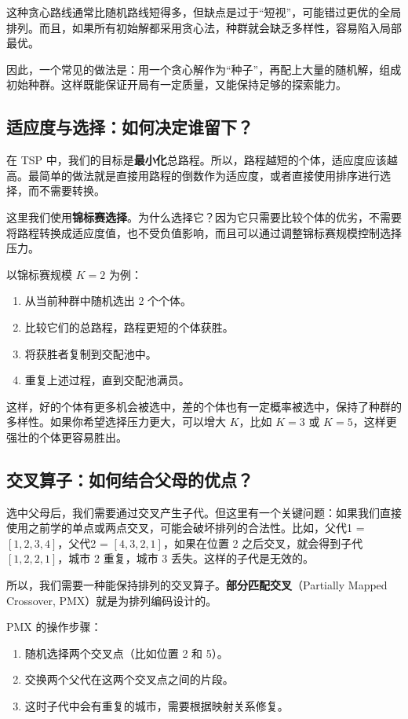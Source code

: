 \documentclass[lang=cn,zihao=-4,a4paper,fontset=windows]{beautybook}
\begin{document}
这种贪心路线通常比随机路线短得多，但缺点是过于“短视”，可能错过更优的全局排列。而且，如果所有初始解都采用贪心法，种群就会缺乏多样性，容易陷入局部最优。

因此，一个常见的做法是：用一个贪心解作为“种子”，再配上大量的随机解，组成初始种群。这样既能保证开局有一定质量，又能保持足够的探索能力。

\subsection{适应度与选择：如何决定谁留下？}

在 TSP 中，我们的目标是\textbf{最小化}总路程。所以，路程越短的个体，适应度应该越高。最简单的做法就是直接用路程的倒数作为适应度，或者直接使用排序进行选择，而不需要转换。

这里我们使用\textbf{锦标赛选择}。为什么选择它？因为它只需要比较个体的优劣，不需要将路程转换成适应度值，也不受负值影响，而且可以通过调整锦标赛规模控制选择压力。

以锦标赛规模 $K=2$ 为例：
\begin{enumerate}
    \item 从当前种群中随机选出 2 个个体。
    \item 比较它们的总路程，路程更短的个体获胜。
    \item 将获胜者复制到交配池中。
    \item 重复上述过程，直到交配池满员。
\end{enumerate}

这样，好的个体有更多机会被选中，差的个体也有一定概率被选中，保持了种群的多样性。如果你希望选择压力更大，可以增大 $K$，比如 $K=3$ 或 $K=5$，这样更强壮的个体更容易胜出。

\subsection{交叉算子：如何结合父母的优点？}

选中父母后，我们需要通过交叉产生子代。但这里有一个关键问题：如果我们直接使用之前学的单点或两点交叉，可能会破坏排列的合法性。比如，父代1 = $[1,2,3,4]$，父代2 = $[4,3,2,1]$，如果在位置 2 之后交叉，就会得到子代 $[1,2,2,1]$，城市 2 重复，城市 3 丢失。这样的子代是无效的。

所以，我们需要一种能保持排列的交叉算子。\textbf{部分匹配交叉}（Partially Mapped Crossover, PMX）就是为排列编码设计的。

PMX 的操作步骤：
\begin{enumerate}
    \item 随机选择两个交叉点（比如位置 2 和 5）。
    \item 交换两个父代在这两个交叉点之间的片段。
    \item 这时子代中会有重复的城市，需要根据映射关系修复。
\end{enumerate}
\end{document}
